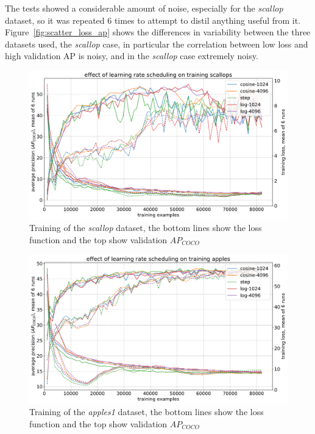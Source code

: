 The tests showed a considerable amount of noise, especially for the \emph{scallop} dataset, so it was repeated 6 times to attempt to distil anything useful from it. Figure~\ref{fig:scatter_loss_ap} shows the differences in variability between the three datasets used, the \emph{scallop} case, in particular the correlation between low loss and high validation \gls{AP} is noisy, and in the \emph{scallop} case extremely noisy. 

\begin{figure}[h]
  \centering
  \includegraphics[width=1.0\linewidth]{charts/training/lr_schedule/scallops.pdf}
  \caption{Training of the \emph{scallop} dataset, the bottom lines show the loss function and the top show validation $AP_{COCO}$}  
  \label{fig:scallop_lr}
\end{figure}

\begin{figure}[h]
  \centering
  \includegraphics[width=1.0\linewidth]{charts/training/lr_schedule/apples.pdf}
  \caption{Training of the \emph{apples1} dataset, the bottom lines show the loss function and the top show validation $AP_{COCO}$}  
  \label{fig:apple_lr}
\end{figure}

